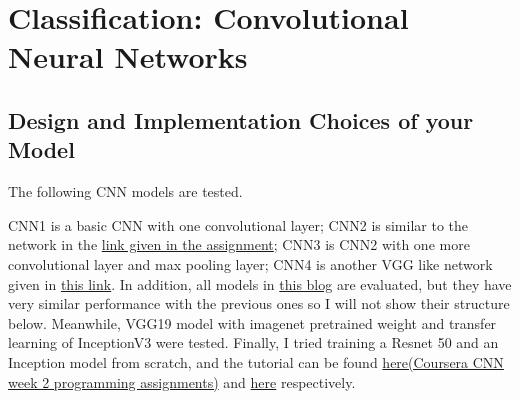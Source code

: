 \documentclass[12pt]{article}
\begin{document}
\section{Classification: Convolutional Neural Networks}

\subsection{Design and Implementation Choices of your Model}

The following CNN models are tested. 

CNN1 is a basic CNN with one convolutional layer; CNN2 is similar to the network in the \href{https://www.kaggle.com/fuzzywizard/fashion-mnist-cnn-keras-accuracy-93/}{link given in the assignment}; CNN3 is CNN2 with one more convolutional layer and max pooling layer; CNN4 is another VGG like network given in \href{http://proc-x.com/2017/09/a-vgg-like-cnn-for-fashion-mnist-with-94-accuracy/}{this link}. In addition, all models in \href{https://solvemprobler.com/blog/2017/09/29/range-of-convolutional-neural-networks-on-fashion-mnist-dataset/}{this blog} are evaluated, but they have very similar performance with the previous ones so I will not show their structure below. Meanwhile, VGG19 model with imagenet pretrained weight and transfer learning of InceptionV3 were tested. Finally, I tried training a Resnet 50 and an Inception model from scratch, and the tutorial can be found \href{https://www.coursera.org/learn/convolutional-neural-networks?specialization=deep-learning#syllabus}{here(Coursera CNN week 2 programming assignments)} and \href{https://machinelearningmastery.com/how-to-implement-major-architecture-innovations-for-convolutional-neural-networks/}{here} respectively.
\end{document}
